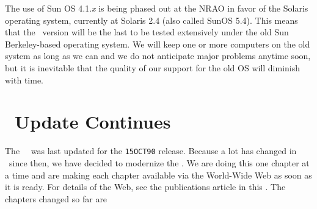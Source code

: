 The use of Sun OS 4.1.{\it x} is being phased out at the NRAO in favor
of the Solaris operating system, currently at Solaris 2.4 (also called
SunOS 5.4).  This means that the \RELEASENAME\ version will be the
last to be tested extensively under the old Sun Berkeley-based
operating system.  We will keep one or more computers on the old
system as long as we can and we do not anticipate major problems
anytime soon, but it is inevitable that the quality of our support for
the old OS will diminish with time.

\section{\Cookbook\ Update Continues}

     The \AIPS\ \Cookbook\ was last updated for the {\tt 15OCT90}
release.  Because a lot has changed in \AIPS\ since then, we have
decided to modernize the \Cookbook.  We are doing this one chapter at
a time and are making each chapter available via the World-Wide Web as
soon as it is ready.  For details of the Web, see the publications
article in this \Aipsletter.  The chapters changed so far are
\vspace{-8pt}
